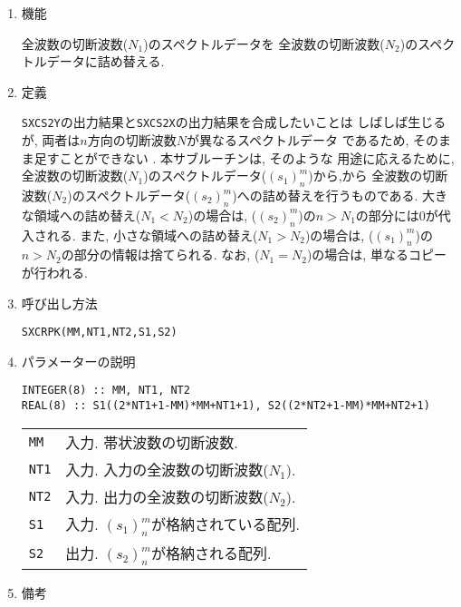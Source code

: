 \documentclass[a4j]{jsarticle}
\begin{document}
\begin{enumerate}

\item 機能

全波数の切断波数($N_1$)のスペクトルデータを
全波数の切断波数($N_2$)のスペクトルデータに詰め替える.

\item 定義

\texttt{SXCS2Y}の出力結果と\texttt{SXCS2X}の出力結果を合成したいことは
しばしば生じるが, 両者は$n$方向の切断波数$N$が異なるスペクトルデータ
であるため, そのまま足すことができない . 本サブルーチンは, そのような
用途に応えるために,
全波数の切断波数($N_1$)のスペクトルデータ($(s_1)^m_n$)から,から
全波数の切断波数($N_2$)のスペクトルデータ($(s_2)^m_n$)への詰め替えを行うものである.
大きな領域への詰め替え($N_1<N_2$)の場合は,
($(s_2)^m_n$)の$n>N_1$の部分には$0$が代入される.
また, 小さな領域への詰め替え($N_1>N_2$)の場合は,
($(s_1)^m_n$)の$n>N_2$の部分の情報は捨てられる.
なお, ($N_1=N_2$)の場合は, 単なるコピーが行われる.

\item 呼び出し方法 
    
\texttt{SXCRPK(MM,NT1,NT2,S1,S2)}
  
\item パラメーターの説明

\begin{verbatim}
INTEGER(8) :: MM, NT1, NT2
REAL(8) :: S1((2*NT1+1-MM)*MM+NT1+1), S2((2*NT2+1-MM)*MM+NT2+1)
\end{verbatim}
  
\begin{tabular}{ll}
\texttt{MM} & 入力. 帯状波数の切断波数.\\  
\texttt{NT1} & 入力. 入力の全波数の切断波数($N_1$).\\
\texttt{NT2} & 入力. 出力の全波数の切断波数($N_2$).\\  
\texttt{S1} & 入力. $(s_1)^m_n$が格納されている配列.\\
\texttt{S2} & 出力. $(s_2)^m_n$が格納される配列.
\end{tabular}

\item 備考

\end{enumerate}
\end{document}
